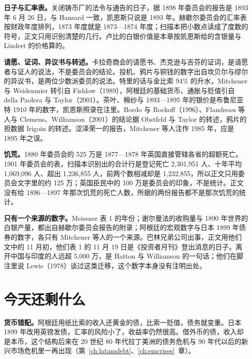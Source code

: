 \begin{deeper}[史料说明]
\textbf{日子与汇率表。}关闭铸币厂的法令与通告的日子，据 1898 年委员会的报告是 1893 年 6 月 26 日，与 Hansard 一致，凯恩斯只说是 1893 年\cite{fowler1899,hansard1893}。赫歇尔委员会的汇率表按财政年度排列，1873 年度就是 1873—1874 年度；扫描本把小数点读成了度数的符号，正文只用识别清楚的几行\cite{herschell1893}。卢比的白银价值是本章按凯恩斯给的含银量与 Lindert 的价格算的。

\textbf{请愿、证词、异议书与转述。}卡拉奇商会的请愿书、杰克逊与吉芬的证词，是请愿者与证人的说法，不是委员会的结论。投机、鸦片与铜钱的数字出自坎贝尔与缪尔的异议书，是两位少数派委员的说法。特里的话与金比索 94\% 的升水，Mitchener 与 Weidenmier 转引自 Fishlow（1989），阿根廷的基础货币、通胀与贬值引自 della Paolera 与 Taylor（2001）。茶叶、棉纱与 1893—1895 年的银价是布鲁尼亚特 1910 年的数字，凯恩斯照录在注里。Bordo 与 Rockoff（1996）、Flandreau 等人与 Clemens、Williamson（2001）的结论据 Obstfeld 与 Taylor 的转述，鸦片的担数据 Irigoin 的转述。涩泽荣一的报告，Mitchener 等人注作 1985 年，应是 1895 年之误。

\textbf{饥荒。}1880 年委员会的 525 万是 1877—1878 年英国直接管辖各省的超额死亡。1901 年委员会的表，扫描本识别出的合计行是登记死亡 2,301,951 人、十年平均 1,069,096 人、超出 1,236,855 人，前两个数相减却是 1,232,855，所以正文只用委员会文字里的约 125 万；英国臣民中的 100 万是委员会的印象，不是统计。正文没有给 1896—1897 年那次饥荒的死亡人数，所据的两份报告都不是那次饥荒的统计。

\textbf{只有一个来源的数字。}Meissner 表 1 的年份；谢尔曼法的收购量与 1890 年世界的白银产量，都出自赫歇尔委员会报告的附录；阿根廷的宏观数字与日本 1899 年债券的数字，各只有 Mitchener 等人的一个来源。巴林兄弟公司出事，正文用他们文中的 11 月初，他们表 1 的 11 月 19 日是《投资者月刊》登出消息的日子。离开中国与印度的人远超 5,000 万，是 Hatton 与 Williamson 的一句话；他们在脚注里说 Lewis（1978）谈过这类迁移，这个数字本身没有注明出处。
\end{deeper}

\section{今天还剩什么}\label{sec:periph-legacy}

\textbf{货币错配。}阿根廷用纸比索的收入还黄金的债，比索一贬值，债务就变重\cite{mitchener2007}。日本 1899 年改用英镑发债，汇率的风险小了，收益率仍然很高\cite{mitchener2009}。借外币的债，收入却是本币，这个结构后来在 20 世纪 80 年代拉丁美洲的债务危机与 90 年代以后的新兴市场危机里一再出现（第~\ref{ch:latamdebt}、\ref{ch:emcrises}~章）。

